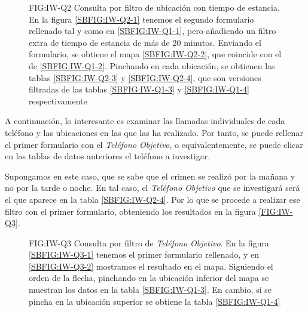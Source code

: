     \begin{figure}[Consulta por filtro de ubicación con tiempo de estancia]{FIG:IW-Q2}
      {Consulta por filtro de ubicación con tiempo de estancia. En la figura \ref{SBFIG:IW-Q2-1} tenemos el segundo formulario rellenado tal y como en \ref{SBFIG:IW-Q1-1}, pero añadiendo un filtro extra de tiempo de estancia de más de 20 minutos. Enviando el formulario, se obtiene el mapa \ref{SBFIG:IW-Q2-2}, que coincide con el de \ref{SBFIG:IW-Q1-2}. Pinchando en cada ubicación, se obtienen las tablas \ref{SBFIG:IW-Q2-3} y \ref{SBFIG:IW-Q2-4}, que son versiones filtradas de las tablas \ref{SBFIG:IW-Q1-3} y \ref{SBFIG:IW-Q1-4} respectivamente}
      \quad
      \quad
      \quad
    \end{figure}
    
    A continuación, lo interesante es examinar las llamadas individuales de cada teléfono y las ubicaciones en las que las ha realizado. Por tanto, se puede rellenar el primer formulario con el \textit{Teléfono Objetivo}, o equivalentemente, se puede clicar en las tablas de datos anteriores el teléfono a investigar.
    
    Supongamos en este caso, que se sabe que el crimen se realizó por la mañana y no por la tarde o noche. En tal caso, el \textit{Teléfono Objetivo} que se investigará será el que aparece en la tabla \ref{SBFIG:IW-Q2-4}. Por lo que se procede a realizar ese filtro con el primer formulario, obteniendo los resultados en la figura \ref{FIG:IW-Q3}. 
    
    \begin{figure}[Consulta por filtro de \textit{Teléfono Objetivo}]{FIG:IW-Q3}
      {Consulta por filtro de \textit{Teléfono Objetivo}. En la figura \ref{SBFIG:IW-Q3-1} tenemos el primer formulario rellenado, y en \ref{SBFIG:IW-Q3-2} mostramos el resultado en el mapa. Siguiendo el orden de la flecha, pinchando en la ubicación inferior del mapa se muestran los datos en la tabla \ref{SBFIG:IW-Q1-3}. En cambio, si se pincha en la ubicación superior se obtiene la tabla \ref{SBFIG:IW-Q1-4}}
      \quad
      \quad
      \quad
    \end{figure}
  
